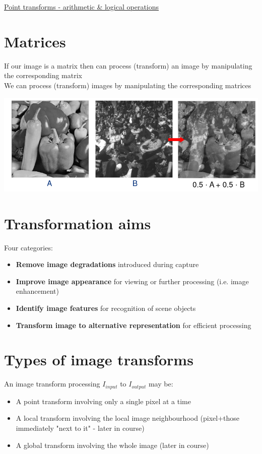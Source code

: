 \documentclass{article}[18pt]
\begin{document}
\begin{center}
\underline{\huge Point transforms - arithmetic \& logical operations}
\end{center}
\section{Matrices}
If our image is a matrix then can process (transform) an image by manipulating the corresponding matrix\\
We can process (transform) images by manipulating the corresponding matrices
\begin{center}
	\includegraphics[scale=0.7]{matrices}
\end{center}
\section{Transformation aims}
Four categories:
\begin{itemize}
	\item \textbf{Remove image degradations} introduced during capture
	\item \textbf{Improve image appearance} for viewing or further processing (i.e. image enhancement)
	\item \textbf{Identify image features} for recognition of scene objects
	\item \textbf{Transform image to alternative representation} for efficient processing 
\end{itemize}
\section{Types of image transforms}
An image transform processing $I_{input}$ to $I_{output}$ may be:
\begin{itemize}
	\item A point transform involving only a single pixel at a time
	\item A local transform involving the local image neighbourhood (pixel+those immediately "next to it" - later in course)
	\item A global transform involving the whole image (later in course)
\end{itemize}
\end{document}

